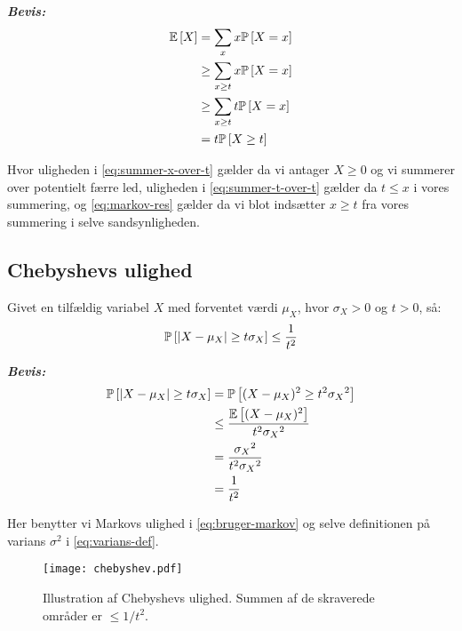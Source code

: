 \textit{\textbf{Bevis:}}
\begin{align}
  \E{X}
  &= \sum_x x \P{X = x} \nonumber \\
  &\geq \sum_{x \geq t} x \P{X = x} \label{eq:summer-x-over-t} \\
  &\geq \sum_{x \geq t} t \P{X = x} \label{eq:summer-t-over-t} \\
  &= t \P{X \geq t} \label{eq:markov-res}
\end{align}

Hvor uligheden i \cref{eq:summer-x-over-t} gælder da vi antager $X \geq 0$ og vi summerer over potentielt færre led, uligheden i \cref{eq:summer-t-over-t} gælder da $t \leq x$ i vores summering, og \cref{eq:markov-res} gælder da vi blot indsætter $x \geq t$ fra vores summering i selve sandsynligheden.

\subsection{Chebyshevs ulighed}
Givet en tilfældig variabel $X$ med forventet værdi $\mu_X$, hvor $\sigma_X > 0$ og $t > 0$, så:
\begin{align}
  \P{|X - \mu_X| \geq t \sigma_X} \leq \frac{1}{t^2} \label{eq:chebyshev}
\end{align}

\textit{\textbf{Bevis:}}
\begin{align}
  \P{|X - \mu_X| \geq t \sigma_X}
  &= \P{(X - \mu_X)^2 \geq t^2 {\sigma_X}^2} \nonumber \\
  &\leq \frac{\E{(X - \mu_X)^2}}{t^2 {\sigma_X}^2} \label{eq:bruger-markov} \\
  &= \frac{{\sigma_X}^2}{t^2 {\sigma_X}^2} \label{eq:varians-def} \\
  &= \frac{1}{t^2} \nonumber
\end{align}

Her benytter vi Markovs ulighed i \cref{eq:bruger-markov} og selve definitionen på varians $\sigma^2$ i \cref{eq:varians-def}.

\begin{figure}[H]
  \begin{center}
  \texttt{[image: chebyshev.pdf]}
  \end{center}
  \caption{Illustration af Chebyshevs ulighed. Summen af de skraverede områder er $\leq 1/t^2$.}
  \label{fig:chebyshev}
\end{figure}










